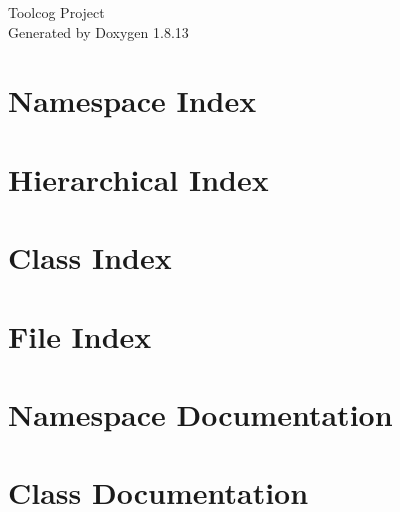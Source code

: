 \documentclass[twoside]{book}
\newcommand{\+}{\discretionary{\mbox{\scriptsize$\hookleftarrow$}}{}{}}
\newcommand{\clearemptydoublepage}{%
  \newpage{\pagestyle{empty}\cleardoublepage}%
}
\begin{document}
\hypersetup{pageanchor=false,
             bookmarksnumbered=true,
             pdfencoding=unicode
            }
\begin{titlepage}
\vspace*{7cm}
\begin{center}%
{\Large Toolcog Project }\\
\vspace*{1cm}
{\large Generated by Doxygen 1.8.13}\\
\end{center}
\end{titlepage}
\clearemptydoublepage
{}
\tableofcontents
\clearemptydoublepage
{}
\hypersetup{pageanchor=true}

\chapter{Namespace Index}

\chapter{Hierarchical Index}

\chapter{Class Index}

\chapter{File Index}

\chapter{Namespace Documentation}

\chapter{Class Documentation}











































\end{document}
